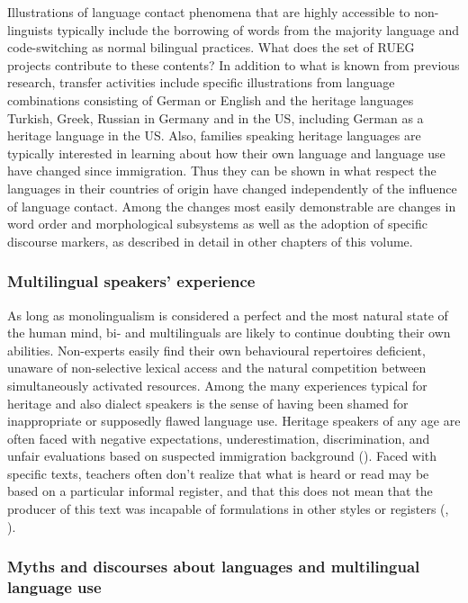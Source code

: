 \documentclass[output=paper,colorlinks,citecolor=brown]{langscibook}
\begin{document}
Illustrations of language contact phenomena that are highly accessible to non-linguists typically include the borrowing of words from the majority language and code-switching as normal bilingual practices. What does the set of RUEG projects contribute to these contents? In addition to what is known from previous research, transfer activities include specific illustrations from language combinations consisting of German or English and the heritage languages Turkish, Greek, Russian in Germany and in the US, including German as a heritage language in the US. Also, families speaking heritage languages are typically interested in learning about how their own language and language use have changed since immigration. Thus they can be shown in what respect the languages in their countries of origin have changed independently of the influence of language contact. Among the changes most easily demonstrable are changes in word order and morphological subsystems as well as the adoption of specific discourse markers, as described in detail in other chapters of this volume.

\subsubsection{Multilingual speakers’ experience}


As long as monolingualism is considered a perfect and the most natural state of the human mind, bi- and multilinguals are likely to continue doubting their own abilities. Non-experts easily find their own behavioural repertoires deficient, unaware of non-selective lexical access and the natural competition between simultaneously activated resources. Among the many experiences typical for heritage and also dialect speakers is the sense of having been shamed for inappropriate or supposedly flawed language use.
Heritage speakers of any age are often faced with negative expectations, underestimation, discrimination, and unfair evaluations based on suspected immigration background (\cite{Bonefeld&Dickhaeuser2018}).
Faced with specific texts, teachers often don’t realize that what is heard or read may be based on a particular informal register, and that this does not mean that the producer of this text was incapable of formulations in other styles or registers (\cite{Keim&Tracy2007}, \cite{Keim2008}). 

\subsubsection{Myths and discourses about languages and multilingual language use}
\end{document}
